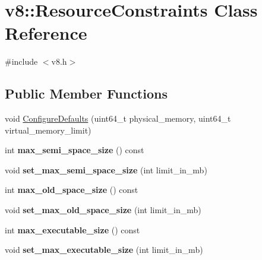 \hypertarget{classv8_1_1_resource_constraints}{}\section{v8\+:\+:Resource\+Constraints Class Reference}
\label{classv8_1_1_resource_constraints}


{\ttfamily \#include $<$v8.\+h$>$}

\subsection*{Public Member Functions}
\begin{DoxyCompactItemize}
\item 
void \hyperlink{classv8_1_1_resource_constraints_aeeaaee4017e8d5f8f0439af2af2ed3a5}{Configure\+Defaults} (uint64\+\_\+t physical\+\_\+memory, uint64\+\_\+t virtual\+\_\+memory\+\_\+limit)
\item 
int {\bfseries max\+\_\+semi\+\_\+space\+\_\+size} () const \hypertarget{classv8_1_1_resource_constraints_aeeecbbdb2c7880bf74d5d7fb9bbc52b3}{}\label{classv8_1_1_resource_constraints_aeeecbbdb2c7880bf74d5d7fb9bbc52b3}

\item 
void {\bfseries set\+\_\+max\+\_\+semi\+\_\+space\+\_\+size} (int limit\+\_\+in\+\_\+mb)\hypertarget{classv8_1_1_resource_constraints_abee8b1156cbba22f09c4fc553b0a34f3}{}\label{classv8_1_1_resource_constraints_abee8b1156cbba22f09c4fc553b0a34f3}

\item 
int {\bfseries max\+\_\+old\+\_\+space\+\_\+size} () const \hypertarget{classv8_1_1_resource_constraints_a72840efdbcfc7bb287c6aea38d0b07b9}{}\label{classv8_1_1_resource_constraints_a72840efdbcfc7bb287c6aea38d0b07b9}

\item 
void {\bfseries set\+\_\+max\+\_\+old\+\_\+space\+\_\+size} (int limit\+\_\+in\+\_\+mb)\hypertarget{classv8_1_1_resource_constraints_a54307a3e64cb7e0198b3a137dddd5965}{}\label{classv8_1_1_resource_constraints_a54307a3e64cb7e0198b3a137dddd5965}

\item 
int {\bfseries max\+\_\+executable\+\_\+size} () const \hypertarget{classv8_1_1_resource_constraints_a037777e608ed1c22fe294ecef5722036}{}\label{classv8_1_1_resource_constraints_a037777e608ed1c22fe294ecef5722036}

\item 
void {\bfseries set\+\_\+max\+\_\+executable\+\_\+size} (int limit\+\_\+in\+\_\+mb)\hypertarget{classv8_1_1_resource_constraints_a2f1ac501d324d6b3d06463c4d6a5c242}{}\label{classv8_1_1_resource_constraints_a2f1ac501d324d6b3d06463c4d6a5c242}


\end{DoxyCompactItemize}

